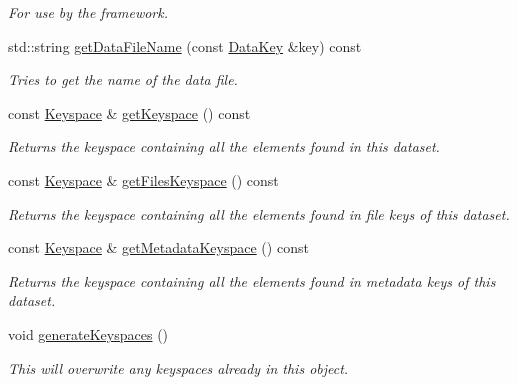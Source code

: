 \begin{DoxyCompactItemize}
\begin{DoxyCompactList}\small\item\em For use by the framework. \item\end{DoxyCompactList}\item 
std::string \hyperlink{classBUSBOY_1_1Dataset_a913b658402f4b86a06067447efaafbf5}{getDataFileName} (const \hyperlink{classBUSBOY_1_1DataKey}{DataKey} \&key) const 
\begin{DoxyCompactList}\small\item\em Tries to get the name of the data file. \item\end{DoxyCompactList}\item 
const \hyperlink{classBUSBOY_1_1Keyspace}{Keyspace} \& \hyperlink{classBUSBOY_1_1Dataset_a6dfa90bee900df4e797ae4e383b21d15}{getKeyspace} () const 
\begin{DoxyCompactList}\small\item\em Returns the keyspace containing all the elements found in this dataset. \item\end{DoxyCompactList}\item 
const \hyperlink{classBUSBOY_1_1Keyspace}{Keyspace} \& \hyperlink{classBUSBOY_1_1Dataset_a5ad9a39da9d07b2713cdb15fdd9790e0}{getFilesKeyspace} () const 
\begin{DoxyCompactList}\small\item\em Returns the keyspace containing all the elements found in file keys of this dataset. \item\end{DoxyCompactList}\item 
const \hyperlink{classBUSBOY_1_1Keyspace}{Keyspace} \& \hyperlink{classBUSBOY_1_1Dataset_a4e05ba67c721535013ee6bd0c3565585}{getMetadataKeyspace} () const 
\begin{DoxyCompactList}\small\item\em Returns the keyspace containing all the elements found in metadata keys of this dataset. \item\end{DoxyCompactList}\item 
void \hyperlink{classBUSBOY_1_1Dataset_a11aa6d3dbb6e95107d6625aaeac99035}{generateKeyspaces} ()
\begin{DoxyCompactList}\small\item\em This will overwrite any keyspaces already in this object. \item\end{DoxyCompactList}\item 

\end{DoxyCompactItemize}
